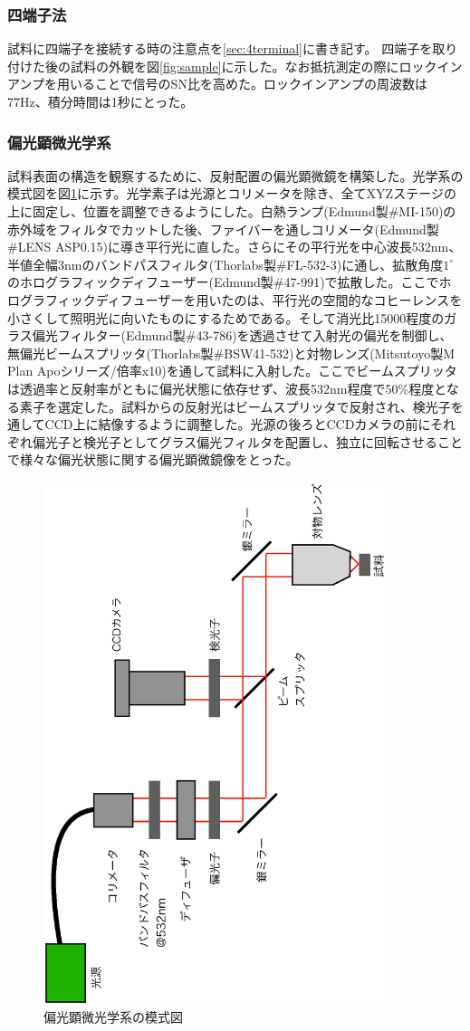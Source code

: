 \subsubsection{四端子法}
試料に四端子を接続する時の注意点を\ref{sec:4terminal}に書き記す。 四端子を取り付けた後の試料の外観を図\ref{fig:sample}に示した。なお抵抗測定の際にロックインアンプを用いることで信号のSN比を高めた。ロックインアンプの周波数は77Hz、積分時間は1秒にとった。

\subsubsection{偏光顕微光学系}
試料表面の構造を観察するために、反射配置の偏光顕微鏡を構築した。光学系の模式図を図\ref{fig:microscope}に示す。光学素子は光源とコリメータを除き、全てXYZステージの上に固定し、位置を調整できるようにした。白熱ランプ(Edmund製\#MI-150)の赤外域をフィルタでカットした後、ファイバーを通しコリメータ(Edmund製\#LENS ASP0.15)に導き平行光に直した。さらにその平行光を中心波長532nm、半値全幅3nmのバンドパスフィルタ(Thorlabs製\#FL-532-3)に通し、拡散角度$1^\circ$のホログラフィックディフューザー(Edmund製\#47-991)で拡散した。ここでホログラフィックディフューザーを用いたのは、平行光の空間的なコヒーレンスを小さくして照明光に向いたものにするためである。そして消光比15000程度のガラス偏光フィルター(Edmund製\#43-786)を透過させて入射光の偏光を制御し、無偏光ビームスプリッタ(Thorlabs製\#BSW41-532)と対物レンズ(Mitsutoyo製M Plan Apoシリーズ/倍率x10)を通して試料に入射した。ここでビームスプリッタは透過率と反射率がともに偏光状態に依存せず、波長532nm程度で50\%程度となる素子を選定した。試料からの反射光はビームスプリッタで反射され、検光子を通してCCD上に結像するように調整した。光源の後ろとCCDカメラの前にそれぞれ偏光子と検光子としてグラス偏光フィルタを配置し、独立に回転させることで様々な偏光状態に関する偏光顕微鏡像をとった。
\begin{figure}[htb]
  \begin{center}
   \includegraphics[width=100mm,angle=270]{experiment/microscope.eps}
  \end{center}
  \caption{偏光顕微光学系の模式図}
  \label{fig:microscope}
\end{figure}

